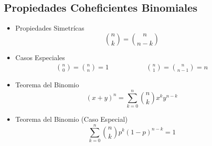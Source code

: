 \documentclass[12pt, fleqn]{report}                             %
\DeclareMathOperator \MegaSpace {\quad \quad}                   %
\theoremstyle{break}                                            %
\begin{document}
            \clearpage
            \subsection{Propiedades Coheficientes Binomiales}

                \begin{itemize}

                    \item 
                        Propiedades Simetrícas
                        \begin{equation*}
                            {n \choose k} = {n \choose n - k}
                        \end{equation*}

                    \item 
                        Casos Especiales
                        \begin{align*}
                            {n \choose 0} = {n \choose n} = 1
                            \MegaSpace \MegaSpace
                            {n \choose 1} = {n \choose n-1} = n   
                        \end{align*}

                    \item 
                        Teorema del Binomio
                        \begin{equation*}
                            (x + y)^n 
                                = \sum_{k=0}^n {n \choose k} x^k y^{n-k}
                        \end{equation*}


                    \item 
                        Teorema del Binomio (Caso Especial)
                        \begin{equation*}
                            \sum_{k=0}^n {n \choose k} p^k (1 - p)^{n-k} = 1
                        \end{equation*}

                \end{itemize}



        \clearpage
\end{document}
